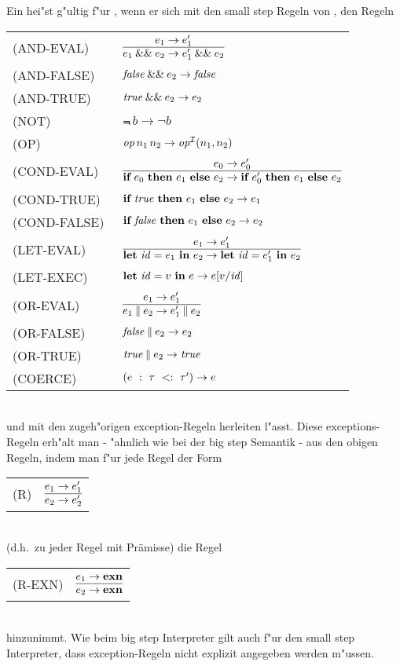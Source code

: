 Ein  hei"st g"ultig f"ur \LONE, wenn er sich mit den small step Regeln von \LZERO, den Regeln\\[5mm]
  \begin{tabular}{ll}
    \mbox{(AND-EVAL)}     & $\regel{e_1 \to e_1'}
                                 {\andalso{e_1}{e_2} \to \andalso{e_1'}{e_2}}$\\[5mm]
    \mbox{(AND-FALSE)}    & ${\text{\it false\/}}\mathbin{\&\&}e_2 \to {\text{\it false\/}}$\\[3mm]
    \mbox{(AND-TRUE)}     & ${\text{\it true\/}}\mathbin{\&\&}e_2 \to e_2$\\[3mm]
    \mbox{(NOT)}          & $\Not\,b \to \neg b$\\[3mm]
    \mbox{(OP)}           & ${\text{\it op\/}}\,n_1\,n_2 \to {\text{\it op\/}}^{{\cal I}}(n_1,n_2)$ \\[3mm]
    \mbox{(COND-EVAL)\ }  & $\regel{e_0 \to e'_0}
                            {\bifte{e_0}{e_1}{e_2} \to \bifte{e'_0}{e_1}{e_2}}$ \\[5mm]
    \mbox{(COND-TRUE)\ }  & $\textbf{if}\ {\text{\it true\/}}\ \textbf{then}\ e_1\ \textbf{else}\ e_2 \to e_1$ \\[3mm]
    \mbox{(COND-FALSE) }  & $\textbf{if}\ {\text{\it false\/}}\ \textbf{then}\ e_1\ \textbf{else}\ e_2 \to e_2$ \\[3mm]
    \mbox{(LET-EVAL)\  }  & $\regel{e_1 \to e'_1}
                            {\bli{\id}{e_1}{e_2} \to \bli{\id}{e'_1}{e_2}}$ \\[5mm]
    \mbox{(LET-EXEC)}       & $\textbf{let}\ {\text{\it id\/}} = v\ \textbf{in}\ e \to e[v/{\text{\it id\/}}]$ \\[5mm]
    \mbox{(OR-EVAL)}      & $\regel{e_1 \to e_1'}
                                   {\orelse{e_1}{e_2} \to \orelse{e_1'}{e_2}}$\\[5mm]
    \mbox{(OR-FALSE)}     & ${\text{\it false\/}}\mathbin{\|}e_2 \to e_2$\\[3mm]
    \mbox{(OR-TRUE)}      & ${\text{\it true\/}}\mathbin{\|}e_2 \to {\text{\it true\/}}$\\[3mm]
    \mbox{(COERCE)}       & $(e\ :\ \tau\ <:\ \tau') \to e$
  \end{tabular}\\[7mm]
und mit den zugeh"origen exception-Regeln herleiten l"asst. Diese exceptions-Regeln erh"alt man - "ahnlich wie
bei der big step Semantik - aus den obigen Regeln, indem man f"ur jede Regel der Form\\[2mm]
  \begin{tabular}{ll}
    \mbox{(R)} & $\regel{e_1 \to e'_1}{e_2 \to e'_2}$
  \end{tabular}\\[3mm]
(d.h.\ zu jeder Regel mit Pr\"amisse) die Regel \\[3mm]
  \begin{tabular}{ll}
    \mbox{(R-EXN)} & $\regel{e_1 \to \exn}{e_2 \to \exn}$
  \end{tabular}\\[3mm]
hinzunimmt. Wie beim big step Interpreter gilt auch f"ur den small step Interpreter, dass exception-Regeln nicht
explizit angegeben werden m"ussen.


